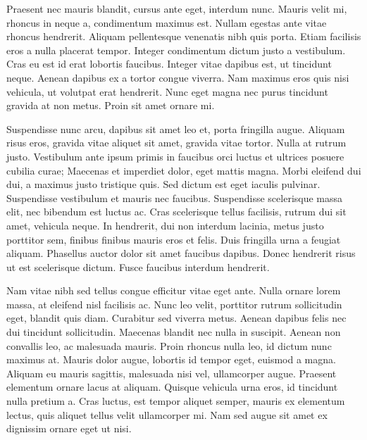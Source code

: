 Praesent nec mauris blandit, cursus ante eget, interdum nunc. Mauris velit mi, rhoncus in neque a, condimentum maximus est. Nullam egestas ante vitae rhoncus hendrerit. Aliquam pellentesque venenatis nibh quis porta. Etiam facilisis eros a nulla placerat tempor. Integer condimentum dictum justo a vestibulum. Cras eu est id erat lobortis faucibus. Integer vitae dapibus est, ut tincidunt neque. Aenean dapibus ex a tortor congue viverra. Nam maximus eros quis nisi vehicula, ut volutpat erat hendrerit. Nunc eget magna nec purus tincidunt gravida at non metus. Proin sit amet ornare mi.

Suspendisse nunc arcu, dapibus sit amet leo et, porta fringilla augue. Aliquam risus eros, gravida vitae aliquet sit amet, gravida vitae tortor. Nulla at rutrum justo. Vestibulum ante ipsum primis in faucibus orci luctus et ultrices posuere cubilia curae; Maecenas et imperdiet dolor, eget mattis magna. Morbi eleifend dui dui, a maximus justo tristique quis. Sed dictum est eget iaculis pulvinar. Suspendisse vestibulum et mauris nec faucibus. Suspendisse scelerisque massa elit, nec bibendum est luctus ac. Cras scelerisque tellus facilisis, rutrum dui sit amet, vehicula neque. In hendrerit, dui non interdum lacinia, metus justo porttitor sem, finibus finibus mauris eros et felis. Duis fringilla urna a feugiat aliquam. Phasellus auctor dolor sit amet faucibus dapibus. Donec hendrerit risus ut est scelerisque dictum. Fusce faucibus interdum hendrerit.

Nam vitae nibh sed tellus congue efficitur vitae eget ante. Nulla ornare lorem massa, at eleifend nisl facilisis ac. Nunc leo velit, porttitor rutrum sollicitudin eget, blandit quis diam. Curabitur sed viverra metus. Aenean dapibus felis nec dui tincidunt sollicitudin. Maecenas blandit nec nulla in suscipit. Aenean non convallis leo, ac malesuada mauris. Proin rhoncus nulla leo, id dictum nunc maximus at. Mauris dolor augue, lobortis id tempor eget, euismod a magna. Aliquam eu mauris sagittis, malesuada nisi vel, ullamcorper augue. Praesent elementum ornare lacus at aliquam. Quisque vehicula urna eros, id tincidunt nulla pretium a. Cras luctus, est tempor aliquet semper, mauris ex elementum lectus, quis aliquet tellus velit ullamcorper mi. Nam sed augue sit amet ex dignissim ornare eget ut nisi. 
